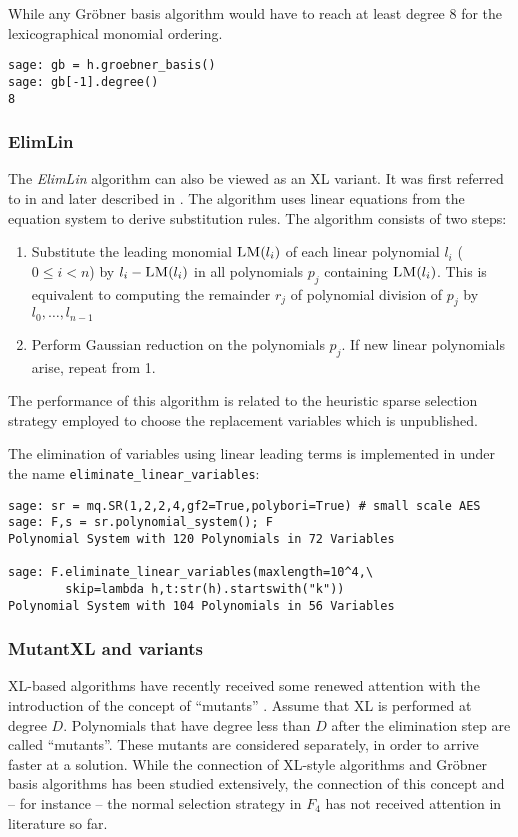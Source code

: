 While any Gröbner basis algorithm would have to reach at least degree 8 for the lexicographical monomial ordering.

\begin{lstlisting}
sage: gb = h.groebner_basis()
sage: gb[-1].degree()
8
\end{lstlisting}

\subsubsection{ElimLin}
The \emph{ElimLin} algorithm can also be viewed as an XL variant. It was first
referred to in \cite{Courtois2006a} and later described in \cite{alg-des}. The
algorithm uses linear equations from the equation system to derive substitution
rules. The algorithm consists of two steps: 
\begin{enumerate}
 \item Substitute the leading monomial $\textsc{LM}(l_i)$ of each linear polynomial $l_i$ ($0 \leq i < n$) by $l_i - \textsc{LM}(l_i)$ in all polynomials $p_j$
containing $\textsc{LM}(l_i)$. This is equivalent to computing the remainder $r_j$ of polynomial division of $p_j$ by $l_0,\dots,l_{n-1}$
 \item Perform Gaussian reduction on the polynomials $p_j$. If new linear polynomials arise, repeat from 1.
\end{enumerate}
The performance of this algorithm is related to the heuristic sparse selection strategy employed to choose the replacement variables which is unpublished.

The elimination of variables using linear leading terms is implemented  in \Sage under the name \mbox{\texttt{eliminate\-\_linear\_variables}}:

\begin{lstlisting}
sage: sr = mq.SR(1,2,2,4,gf2=True,polybori=True) # small scale AES
sage: F,s = sr.polynomial_system(); F
Polynomial System with 120 Polynomials in 72 Variables

sage: F.eliminate_linear_variables(maxlength=10^4,\
        skip=lambda h,t:str(h).startswith("k"))
Polynomial System with 104 Polynomials in 56 Variables
\end{lstlisting}


\subsubsection{MutantXL and variants}
XL-based algorithms have recently received some renewed attention with the introduction of the concept of ``mutants'' \cite{mohamed-werner-ding-buchmann:cans09,mxl2,mohamed-cabarcas-ding-buchmann-bulygin:icisc09}. Assume that XL is performed at degree $D$. Polynomials that have degree less than $D$ after the elimination step are called ``mutants''. These mutants are considered separately, in order to arrive faster at a solution. While the connection of XL-style algorithms and Gröbner basis algorithms has been studied extensively, the connection of this concept and -- for instance -- the normal selection strategy in $F_4$ has not received attention in literature so far.

